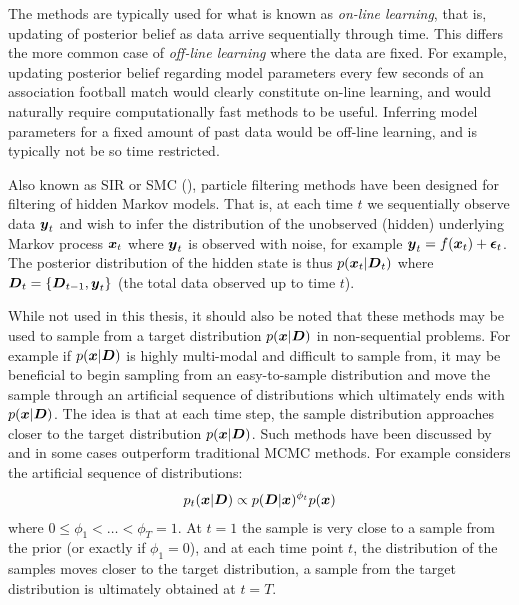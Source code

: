 The methods are typically used for what is known as \textit{on-line learning}, that is, updating of posterior belief as
data arrive sequentially through time. This differs the more common case of \textit{off-line learning} where the data
are fixed. For example, updating posterior belief regarding model parameters every few seconds of an association
football match would clearly constitute on-line learning, and would naturally require computationally fast methods to be
useful. Inferring model parameters for a fixed amount of past data would be off-line learning, and is typically not be
so time restricted.

Also known as \gls{SIR} or \gls{SMC} (\cite{Sanjeev2002}), particle filtering methods have been designed for filtering
of hidden Markov models. That is, at each time \(t\) we sequentially observe data \(\boldsymbol{y}_t\) and wish to infer the
distribution of the unobserved (hidden) underlying Markov process \(\boldsymbol{x}_t\) where \(\boldsymbol{y}_t\) is observed with
noise, for example \(\boldsymbol{y}_t = f(\boldsymbol{x}_t) + \boldsymbol{\epsilon}_t\). The posterior distribution of the hidden state
is thus \(p(\boldsymbol{x}_t | \boldsymbol{D}_t)\) where \(\boldsymbol{D}_t = \{\boldsymbol{D}_{t-1}, \boldsymbol{y}_t\}\) (the total data observed up to time
\(t\)).

While not used in this thesis, it should also be noted that these methods may be used to sample from a target
distribution \(p(\boldsymbol{x} | \boldsymbol{D})\) in non-sequential problems. For example if \(p(\boldsymbol{x} | \boldsymbol{D})\) is highly
multi-modal and difficult to sample from, it may be beneficial to begin sampling from an easy-to-sample distribution and
move the sample through an artificial sequence of distributions which ultimately ends with \(p(\boldsymbol{x} | \boldsymbol{D})\). The
idea is that at each time step, the sample distribution approaches closer to the target distribution \(p(\boldsymbol{x} |
\boldsymbol{D})\). Such methods have been discussed by \cite{neal2001, chopin2002, del2006} and in some cases outperform
traditional \gls{MCMC} methods. For example \cite{del2006} considers the artificial sequence of distributions:
\begin{align} 
p_t(\boldsymbol{x} | \boldsymbol{D}) \propto p(\boldsymbol{D} | \boldsymbol{x})^{\phi_t} p(\boldsymbol{x})
\end{align}
where \(0 \leq \phi_1 < \ldots < \phi_T = 1\). At \(t = 1\) the sample is very close to a sample from the prior (or
exactly if \(\phi_1 = 0\)), and at each time point \(t\), the distribution of the samples moves closer to the target
distribution, a sample from the target distribution is ultimately obtained at \(t = T\).

